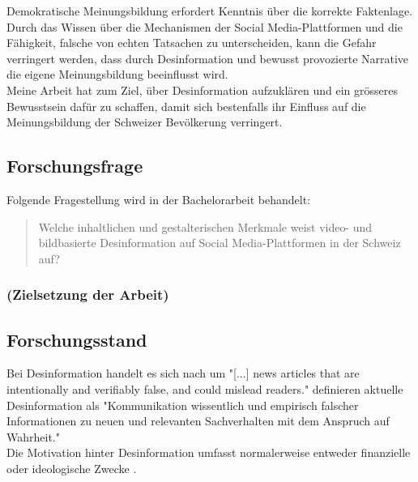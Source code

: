 \documentclass[12pt,a4paper]{article}        %
\begin{document}
Demokratische Meinungsbildung erfordert Kenntnis über die korrekte Faktenlage. Durch das Wissen über die Mechanismen der Social Media-Plattformen und die Fähigkeit, falsche von echten Tatsachen zu unterscheiden, kann die Gefahr verringert werden, dass durch Desinformation und bewusst provozierte Narrative die eigene Meinungsbildung beeinflusst wird.\\
Meine Arbeit hat zum Ziel, über Desinformation aufzuklären und ein grösseres Bewusstsein dafür zu schaffen, damit sich bestenfalls ihr Einfluss auf die Meinungsbildung der Schweizer Bevölkerung verringert.

\subsection{Forschungsfrage}
Folgende Fragestellung wird in der Bachelorarbeit behandelt:\\

\begin{quote}
  Welche inhaltlichen und gestalterischen Merkmale weist video- und bildbasierte Desinformation auf Social Media-Plattformen in der Schweiz auf?
\end{quote}

\subsubsection{(Zielsetzung der Arbeit)}

\subsection{Forschungsstand}

Bei Desinformation handelt es sich nach \textcite[213]{allcott_social_2017} um "[...] news articles that are intentionally and verifiably false, and could mislead readers." \textcite{marx_fake_2020} definieren aktuelle Desinformation als "Kommunikation wissentlich und empirisch falscher Informationen zu neuen und relevanten Sachverhalten mit dem Anspruch auf Wahrheit." \\
Die Motivation hinter Desinformation umfasst normalerweise entweder finanzielle oder ideologische Zwecke \parencites[vgl.][138]{tandoc_defining_2018}[225]{schmidt_meinungsbildung_2022}[154-155]{lange_unsicherheit_2019}.
\end{document}
